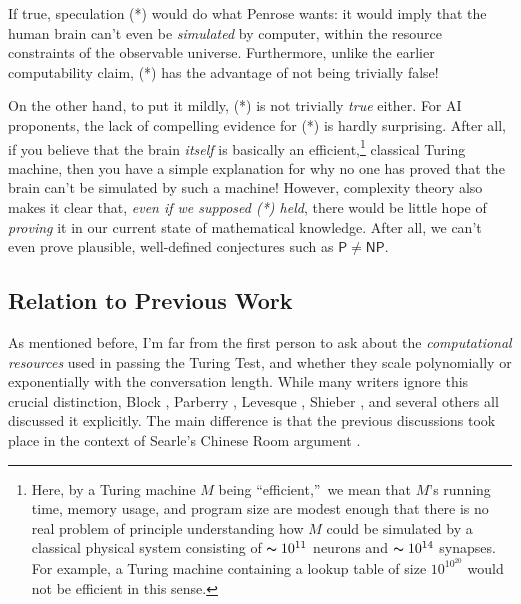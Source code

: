 \documentclass[12pt,onecolumn]{article}%
\begin{document}
If true, speculation (*) would do what Penrose wants: it would imply that the
human brain can't even be \textit{simulated} by computer, within the resource
constraints of the observable universe. Furthermore, unlike the earlier
computability claim, (*) has the advantage of not being trivially false!

On the other hand, to put it mildly, (*) is not trivially \textit{true}
either. For AI proponents, the lack of compelling evidence for (*) is hardly
surprising. After all, if you believe that the brain \textit{itself} is
basically an efficient,\footnote{Here, by a Turing machine $M$ being
\textquotedblleft efficient,\textquotedblright\  we mean that $M$'s running
time, memory usage, and program size are modest enough that there is no real
problem of principle understanding how $M$ could be simulated by a classical
physical system consisting of $\thicksim10^{11}$ neurons and $\thicksim
10^{14}$ synapses. For example, a Turing machine containing a lookup table
of size $10^{10^{20}}$ would not be efficient in this sense.} classical
Turing machine, then you have a simple explanation for why no one has proved
that the brain can't be simulated by such a machine! However, complexity
theory also makes it clear that, \textit{even if we supposed (*) held}, there
would be little hope of \textit{proving} it in our current state of
mathematical knowledge. After all, we can't even prove plausible,
well-defined conjectures such as $\mathsf{P}\neq\mathsf{NP}$.

\subsection{Relation to Previous Work\label{PREVWORK}}

As mentioned before, I'm far from the first person to ask about the
\textit{computational resources} used in passing the Turing Test, and whether
they scale polynomially or exponentially with the conversation length. While
many writers ignore this crucial distinction, Block \cite{block}, Parberry
\cite{parberry}, Levesque \cite{levesque}, Shieber \cite{shieber}, and several
others all discussed it explicitly. The main difference is that the previous
discussions took place in the context of Searle's Chinese Room argument
\cite{searle}.
\end{document}
